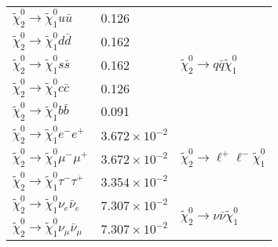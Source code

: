 \begin{table}[htbp]
\begin{center}
{\begin{tabular}{lll}
                $\widetilde{\chi}_{2}^{0} \to \widetilde{\chi}_{1}^{0} u \bar{u}$                   & 0.126                 & \multirow{5}{*}{$\widetilde{\chi}^{0}_{2} \to q \bar{q} \widetilde{\chi}^{0}_{1}$}\\
                $\widetilde{\chi}_{2}^{0} \to \widetilde{\chi}_{1}^{0} d \bar{d}$                   & 0.162                 & \\
                $\widetilde{\chi}_{2}^{0} \to \widetilde{\chi}_{1}^{0} s \bar{s}$                   & 0.162                 & \\
                $\widetilde{\chi}_{2}^{0} \to \widetilde{\chi}_{1}^{0} c \bar{c}$                   & 0.126                 & \\
                $\widetilde{\chi}_{2}^{0} \to \widetilde{\chi}_{1}^{0} b \bar{b}$                   & 0.091                 & \\
                \hline
                $\widetilde{\chi}_{2}^{0} \to \widetilde{\chi}_{1}^{0} e^{-} e^{+}$                 & $3.672\times 10^{-2}$ & \multirow{3}{*}{$\widetilde{\chi}^{0}_{2} \to \ell^{+} \ell^{-} \widetilde{\chi}^{0}_{1}$}\\
                $\widetilde{\chi}_{2}^{0} \to \widetilde{\chi}_{1}^{0} \mu^{-} \mu^{+}$             & $3.672\times 10^{-2}$ & \\
                $\widetilde{\chi}_{2}^{0} \to \widetilde{\chi}_{1}^{0} \tau^{-} \tau^{+}$           & $3.354\times 10^{-2}$ & \\
                \hline
                $\widetilde{\chi}_{2}^{0} \to \widetilde{\chi}_{1}^{0} \nu_{e} \bar{\nu}_{e}$       & $7.307\times 10^{-2}$ & \multirow{3}{*}{$\widetilde{\chi}^{0}_{2} \to \nu \bar{\nu} \widetilde{\chi}^{0}_{1}$}\\
                $\widetilde{\chi}_{2}^{0} \to \widetilde{\chi}_{1}^{0} \nu_{\mu} \bar{\nu}_{\mu}$   & $7.307\times 10^{-2}$ & \\

\end{tabular}}
\end{center}
\end{table}
